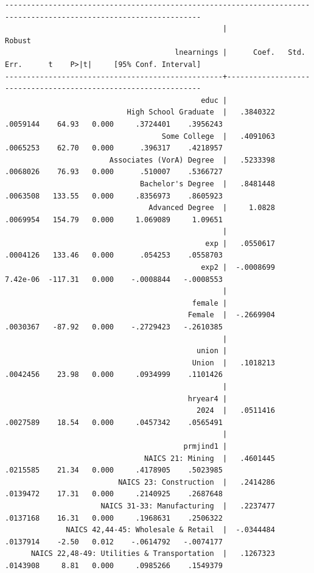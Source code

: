 \documentclass[
]{book}
\begin{document}
\begin{verbatim}
-------------------------------------------------------------------------------------------------------------------
                                                  |               Robust
                                       lnearnings |      Coef.   Std. Err.      t    P>|t|     [95% Conf. Interval]
--------------------------------------------------+----------------------------------------------------------------
                                             educ |
                            High School Graduate  |   .3840322   .0059144    64.93   0.000     .3724401    .3956243
                                    Some College  |   .4091063   .0065253    62.70   0.000      .396317    .4218957
                        Associates (VorA) Degree  |   .5233398   .0068026    76.93   0.000      .510007    .5366727
                               Bachelor's Degree  |   .8481448   .0063508   133.55   0.000     .8356973    .8605923
                                 Advanced Degree  |     1.0828   .0069954   154.79   0.000     1.069089     1.09651
                                                  |
                                              exp |   .0550617   .0004126   133.46   0.000      .054253    .0558703
                                             exp2 |  -.0008699   7.42e-06  -117.31   0.000    -.0008844   -.0008553
                                                  |
                                           female |
                                          Female  |  -.2669904   .0030367   -87.92   0.000    -.2729423   -.2610385
                                                  |
                                            union |
                                           Union  |   .1018213   .0042456    23.98   0.000     .0934999    .1101426
                                                  |
                                          hryear4 |
                                            2024  |   .0511416   .0027589    18.54   0.000     .0457342    .0565491
                                                  |
                                         prmjind1 |
                                NAICS 21: Mining  |   .4601445   .0215585    21.34   0.000     .4178905    .5023985
                          NAICS 23: Construction  |   .2414286   .0139472    17.31   0.000     .2140925    .2687648
                      NAICS 31-33: Manufacturing  |   .2237477   .0137168    16.31   0.000     .1968631    .2506322
              NAICS 42,44-45: Wholesale & Retail  |  -.0344484   .0137914    -2.50   0.012    -.0614792   -.0074177
      NAICS 22,48-49: Utilities & Transportation  |   .1267323   .0143908     8.81   0.000     .0985266    .1549379

\end{verbatim}
\end{document}
